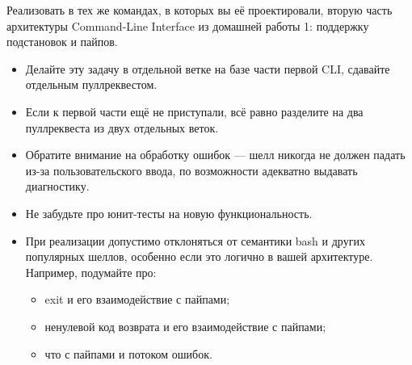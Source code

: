 \documentclass[a5paper]{homework}
\begin{document}

Реализовать в тех же командах, в которых вы её проектировали, вторую часть архитектуры Command-Line Interface из домашней работы 1: поддержку подстановок и пайпов.

\begin{itemize}
    \item Делайте эту задачу в отдельной ветке на базе части первой CLI, сдавайте отдельным пуллреквестом.
    \item Если к первой части ещё не приступали, всё равно разделите на два пуллреквеста из двух отдельных веток.
    \item Обратите внимание на обработку ошибок --- шелл никогда не должен падать из-за пользовательского ввода, по возможности адекватно выдавать диагностику.
    \item Не забудьте про юнит-тесты на новую функциональность.
    \item При реализации допустимо отклоняться от семантики bash и других популярных шеллов, особенно если это логично в вашей архитектуре. Например, подумайте про:
    \begin{itemize}
        \item exit и его взаимодействие с пайпами;
        \item ненулевой код возврата и его взаимодействие с пайпами;
        \item что с пайпами и потоком ошибок.
    \end{itemize}
\end{itemize}
\end{document}
